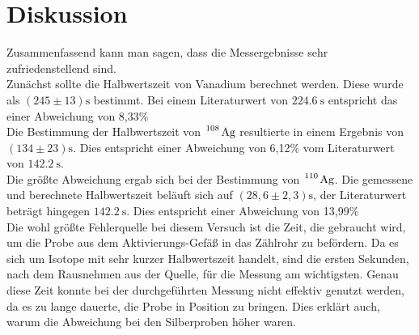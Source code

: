 \section{Diskussion}
\label{sec:Diskussion}

Zusammenfassend kann man sagen, dass die Messergebnisse sehr zufriedenstellend sind.\\
Zunächst sollte die Halbwertszeit von Vanadium berechnet werden. Diese wurde als $(245 \pm 13) \si{\second}$ bestimmt. Bei einem Literaturwert von $\SI{224,6}{\second}$
entspricht das einer Abweichung von 8,33\% \\
Die Bestimmung der Halbwertszeit von $\ce{^108 Ag}$ resultierte in einem Ergebnis von $(134 \pm 23) \si{\second}$. Dies entspricht einer Abweichung von 6,12\% vom
Literaturwert von $\SI{142,2}{\second}$.\\
Die größte Abweichung ergab sich bei der Bestimmung von $\ce{^110 Ag}$. Die gemessene und berechnete Halbwertszeit beläuft sich auf $(28,6 \pm 2,3) \si{\second}$, der
Literaturwert beträgt hingegen $\SI{142,2}{\second}$. Dies entspricht einer Abweichung von 13,99\% \\
\newline
Die wohl größte Fehlerquelle bei diesem Versuch ist die Zeit, die gebraucht wird, um die Probe aus dem Aktivierungs-Gefäß in das Zählrohr zu befördern. Da es sich um
Isotope mit sehr kurzer Halbwertszeit handelt, sind die ersten Sekunden, nach dem Rausnehmen aus der Quelle, für die Messung am wichtigsten. Genau diese Zeit konnte
bei der durchgeführten Messung nicht effektiv genutzt werden, da es zu lange dauerte, die Probe in Position zu bringen. Dies erklärt auch, warum die Abweichung bei den
Silberproben höher waren.